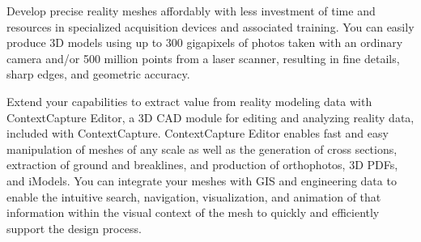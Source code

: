 Develop precise reality meshes affordably with less investment of time and resources in specialized acquisition devices and associated training. You can easily produce 3D models using up to 300 gigapixels of photos taken with an ordinary camera and/or 500 million points from a laser scanner, resulting in fine details, sharp edges, and geometric accuracy.

Extend your capabilities to extract value from reality modeling data with ContextCapture Editor, a 3D CAD module for editing and analyzing reality data, included with ContextCapture. ContextCapture Editor enables fast and easy manipulation of meshes of any scale as well as the generation of cross sections, extraction of ground and breaklines, and production of orthophotos, 3D PDFs, and iModels. You can integrate your meshes with GIS and engineering data to enable the intuitive search, navigation, visualization, and animation of that information within the visual context of the mesh to quickly and efficiently support the design process.  